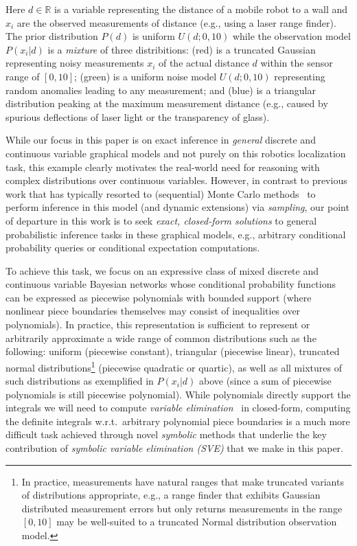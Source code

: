 \documentclass[letterpaper]{article}
\newcommand{\R}{\mathbb{R}}
\begin{document}
Here $d \in \R$ is a variable representing the distance of a
mobile robot to a wall and $x_i$ are the observed measurements of
distance (e.g., using a laser range finder).  The prior distribution
$P(d)$ is uniform $U(d;0,10)$ while the observation model
$P(x_i|d)$ is a \emph{mixture} of three distribitions: (red) is a
truncated Gaussian 
representing noisy measurements $x_i$ of the actual
distance $d$ within the sensor range of $[0,10]$; 
(green) is a uniform noise model $U(d;0,10)$
representing random anomalies leading to any measurement; and
(blue) is a triangular distribution peaking at the maximum measurement
distance (e.g., caused by spurious deflections of laser light or the 
transparency of glass).

While our focus in this paper is on exact inference in \emph{general}
discrete and continuous variable graphical models and not purely on
this robotics localization task, this example clearly motivates the
real-world need for reasoning with complex distributions over
continuous variables.  However, in contrast to previous work that has
typically resorted to (sequential) Monte Carlo
methods~\cite{thrun_mcl,particle_filters} to perform inference in this
model (and dynamic extensions) via 
\emph{sampling}, our point of departure in this work is to seek \emph{exact,
closed-form solutions} to general probabilistic inference tasks in
these graphical models, e.g., arbitrary conditional probability 
queries or conditional expectation computations.

To achieve this task, we focus on an expressive class of mixed
discrete and continuous variable Bayesian networks whose conditional
probability functions can be expressed as piecewise polynomials with
bounded support (where nonlinear piece boundaries themselves may consist
of inequalities over polynomials).
In practice, this representation is sufficient to represent or
arbitrarily approximate a wide range of common distributions such as  
the following: uniform (piecewise constant), triangular
(piecewise linear), truncated normal distributions\footnote{In
practice, measurements have natural ranges that make truncated
variants of distributions appropriate, e.g., a range finder that
exhibits Gaussian distributed measurement errors but only returns
measurements in the range $[0,10]$ may be well-suited to a truncated
Normal distribution observation model.}  (piecewise quadratic or
quartic), as well as all mixtures of such distributions as exemplified
in $P(x_i|d)$ above (since a sum of piecewise polynomials is still piecewise
polynomial).  While polynomials directly support the integrals we will
need to compute \emph{variable elimination}~\cite{varelim} in
closed-form, computing the definite integrals w.r.t.\ arbitrary
polynomial piece boundaries is a much more difficult task achieved
through novel \emph{symbolic} methods that underlie the key
contribution of \emph{symbolic variable elimination (SVE)} that we
make in this paper.
\end{document}
